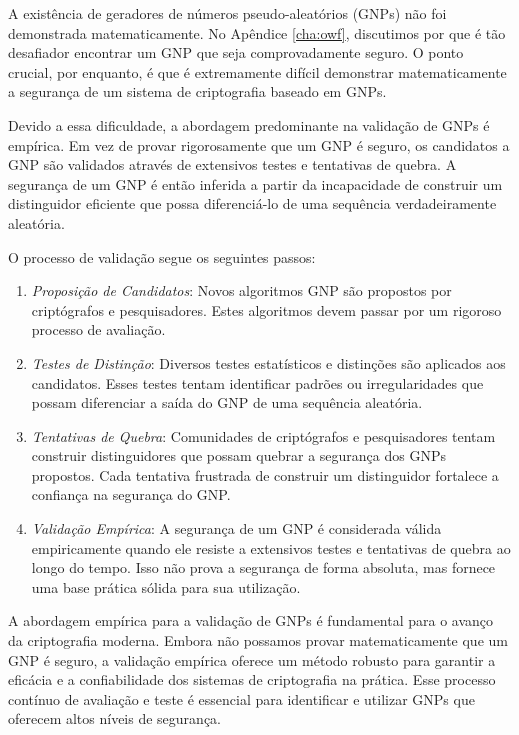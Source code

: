 A existência de geradores de números pseudo-aleatórios (GNPs) não foi demonstrada matematicamente.
No Apêndice \ref{cha:owf}, discutimos por que é tão desafiador encontrar um GNP que seja comprovadamente seguro.
O ponto crucial, por enquanto, é que é extremamente difícil demonstrar matematicamente a segurança de um sistema de criptografia baseado em GNPs.

Devido a essa dificuldade, a abordagem predominante na validação de GNPs é empírica.
Em vez de provar rigorosamente que um GNP é seguro, os candidatos a GNP são validados através de extensivos testes e tentativas de quebra.
A segurança de um GNP é então inferida a partir da incapacidade de construir um distinguidor eficiente que possa diferenciá-lo de uma sequência verdadeiramente aleatória.

O processo de validação segue os seguintes passos:
\begin{enumerate}
\item[] {\em Proposição de Candidatos}:
  Novos algoritmos GNP são propostos por criptógrafos e pesquisadores.
  Estes algoritmos devem passar por um rigoroso processo de avaliação.
\item[] {\em Testes de Distinção}:
  Diversos testes estatísticos e distinções são aplicados aos candidatos.
  Esses testes tentam identificar padrões ou irregularidades que possam diferenciar a saída do GNP de uma sequência aleatória.
\item[] {\em Tentativas de Quebra}:
  Comunidades de criptógrafos e pesquisadores tentam construir distinguidores que possam quebrar a segurança dos GNPs propostos.
  Cada tentativa frustrada de construir um distinguidor fortalece a confiança na segurança do GNP.
\item[] {\em Validação Empírica}:
  A segurança de um GNP é considerada válida empiricamente quando ele resiste a extensivos testes e tentativas de quebra ao longo do tempo.
  Isso não prova a segurança de forma absoluta, mas fornece uma base prática sólida para sua utilização.
\end{enumerate}

A abordagem empírica para a validação de GNPs é fundamental para o avanço da criptografia moderna.
Embora não possamos provar matematicamente que um GNP é seguro, a validação empírica oferece um método robusto para garantir a eficácia e a confiabilidade dos sistemas de criptografia na prática.
Esse processo contínuo de avaliação e teste é essencial para identificar e utilizar GNPs que oferecem altos níveis de segurança.

